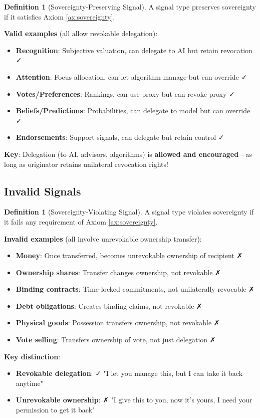\documentclass[11pt,a4paper]{article}
\theoremstyle{definition}
\newtheorem{definition}[theorem]{Definition}
\theoremstyle{remark}
\begin{document}
\begin{definition}[Sovereignty-Preserving Signal]
A signal type preserves sovereignty if it satisfies Axiom \ref{ax:sovereignty}.

\textbf{Valid examples} (all allow revokable delegation):
\begin{itemize}
\item \textbf{Recognition}: Subjective valuation, can delegate to AI but retain revocation ✓
\item \textbf{Attention}: Focus allocation, can let algorithm manage but can override ✓
\item \textbf{Votes/Preferences}: Rankings, can use proxy but can revoke proxy ✓
\item \textbf{Beliefs/Predictions}: Probabilities, can delegate to model but can override ✓
\item \textbf{Endorsements}: Support signals, can delegate but retain control ✓
\end{itemize}

\textbf{Key}: Delegation (to AI, advisors, algorithms) is \textbf{allowed and encouraged}—as long as originator retains unilateral revocation rights!
\end{definition}

\subsection{Invalid Signals}

\begin{definition}[Sovereignty-Violating Signal]
A signal type violates sovereignty if it fails any requirement of Axiom \ref{ax:sovereignty}.

\textbf{Invalid examples} (all involve unrevokable ownership transfer):
\begin{itemize}
\item \textbf{Money}: Once transferred, becomes unrevokable ownership of recipient ✗
\item \textbf{Ownership shares}: Transfer changes ownership, not revokable ✗
\item \textbf{Binding contracts}: Time-locked commitments, not unilaterally revocable ✗
\item \textbf{Debt obligations}: Creates binding claims, not revokable ✗
\item \textbf{Physical goods}: Possession transfers ownership, not revokable ✗
\item \textbf{Vote selling}: Transfers ownership of vote, not just delegation ✗
\end{itemize}

\textbf{Key distinction}:
\begin{itemize}
\item \textbf{Revokable delegation}: ✓ "I let you manage this, but I can take it back anytime"
\item \textbf{Unrevokable ownership}: ✗ "I give this to you, now it's yours, I need your permission to get it back"
\end{itemize}
\end{definition}
\end{document}
